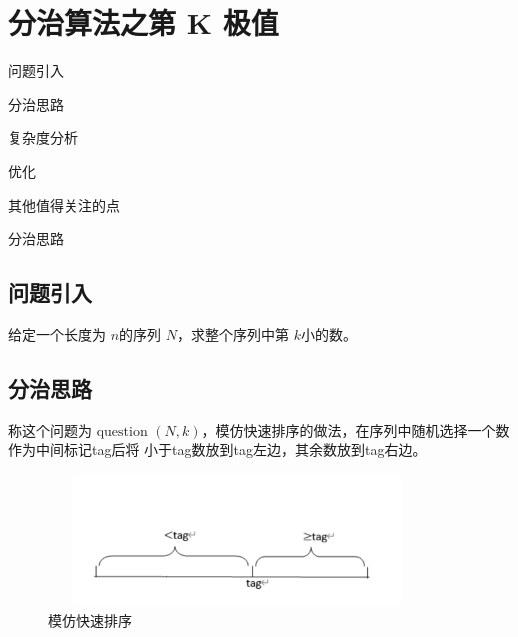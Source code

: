 \chapter{分治算法之第 K 极值}
\begin{introduction}
	\item 问题引入
	\item 分治思路
	\item 复杂度分析
	\item 优化
	\item 其他值得关注的点
	\item 分治思路
	
\end{introduction}
\section{问题引入}
给定一个长度为 $n$的序列 $N$，求整个序列中第 $k$小的数。
\section{分治思路}
称这个问题为$\text { question }(N, k)$，模仿快速排序的做法，在序列中随机选择一个数作为中间标记tag后将
小于tag数放到tag左边，其余数放到tag右边。
\begin{figure}[h]
	\begin{minipage}[t]{1\linewidth}
		\centering
		\includegraphics[width=10cm,height=3.5cm]{image/kth1.png}
		\caption{模仿快速排序}
	\end{minipage}
\end{figure}
